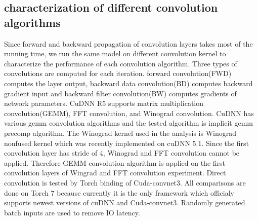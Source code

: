 

\subsection{characterization of different convolution algorithms}
Since forward and backward propagation of convolution layers takes most of the running time, we run the same model on different convolution kernel to characterize the performance of each convolution algorithm.
Three types of convolutions are computed for each iteration.
forward convolution(FWD) computes the layer output, backward data convolution(BD) computes backward gradient input and backward filter convolution(BW) computes gradients of network parameters.
CuDNN R5 supports matrix multiplication convolution(GEMM), FFT convolution, and Winograd convolution.
CuDNN has various gemm convolution algorithms and the tested algorithm is implicit gemm precomp algorithm.
The Winograd kernel used in the analysis is Winograd nonfused kernel which was recently implemented  on cuDNN 5.1.
Since the first convolution layer has stride of 4, Winograd and FFT convolution cannot be applied.
Therefore GEMM convolution algorithm is applied on the first convolution layers of Wingrad and FFT convolution experiment.
Direct convolution is tested by Torch binding of Cuda-convnet3.
All comparisons are done on Torch 7 because currently it is the only framework which officialy supports newest versions of cuDNN and Cuda-convnet3.
Randomly generated batch inputs are used to remove IO latency.

